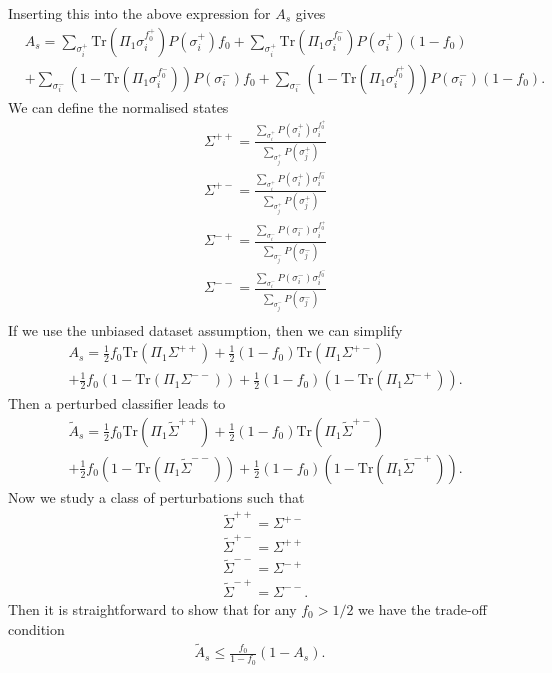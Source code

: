\documentclass[onecolumn,prx, superscriptaddress,longbibliography,margin=1mm 11pt]{revtex4-2}
\begin{document}
Inserting this into the above expression for $A_s$ gives
\begin{align}
    &A_s=\sum_{\sigma_i^+}\text{Tr}(\Pi_1 \sigma^{f_0^+}_i)P(\sigma^+_i)f_0+\sum_{\sigma_i^+}\text{Tr}(\Pi_1 \sigma^{f_0^-}_i)P(\sigma^+_i)(1-f_0) \nonumber \\
    &+\sum_{\sigma_i^-}(1-\text{Tr}(\Pi_{1} \sigma^{f_0^-}_i))P(\sigma^-_i)f_0+ \sum_{\sigma_i^-}(1-\text{Tr}(\Pi_{1} \sigma^{f_0^+}_i))P(\sigma^-_i)(1-f_0).
\end{align}
We can define the normalised states
\begin{align}
    & \Sigma^{++}=\frac{\sum_{\sigma_i^+} P(\sigma_i^+)\sigma^{f_0^+}_i}{\sum_{\sigma_j^+} P(\sigma_j^+)} \nonumber \\
    &\Sigma^{+-}=\frac{\sum_{\sigma_i^+} P(\sigma_i^+)\sigma^{f_0^-}_i}{\sum_{\sigma_j^+} P(\sigma_j^+)} \nonumber \\
    &\Sigma^{-+}=\frac{\sum_{\sigma_i^-} P(\sigma_i^-)\sigma^{f_0^+}_i}{\sum_{\sigma_j^-} P(\sigma_j^-)} \nonumber \\
     &\Sigma^{--}=\frac{\sum_{\sigma_i^-} P(\sigma_i^-)\sigma^{f_0^-}_i}{\sum_{\sigma_j^-} P(\sigma_j^-)} \nonumber \\
\end{align}
If we use the unbiased dataset assumption, then we can simplify
\begin{align}
  &  A_s=\frac{1}{2}f_0 \text{Tr}(\Pi_1 \Sigma^{++})+\frac{1}{2}(1-f_0)\text{Tr}(\Pi_1\Sigma^{+-}) \nonumber \\
&+\frac{1}{2}f_0(1-\text{Tr}(\Pi_1 \Sigma^{--}))+\frac{1}{2}(1-f_0)(1-\text{Tr}(\Pi_1 \Sigma^{-+})).
\end{align}
Then a perturbed classifier leads to 
\begin{align}
    & \tilde{A}_s=\frac{1}{2}f_0 \text{Tr}(\Pi_1 \tilde{\Sigma}^{++})+\frac{1}{2}(1-f_0)\text{Tr}(\Pi_1\tilde{\Sigma}^{+-}) \nonumber \\
&+\frac{1}{2}f_0(1-\text{Tr}(\Pi_1 \tilde{\Sigma}^{--}))+\frac{1}{2}(1-f_0)(1-\text{Tr}(\Pi_1 \tilde{\Sigma}^{-+})).
\end{align}
Now we study a class of perturbations such that 
\begin{align}
    & \tilde{\Sigma}^{++}=\Sigma^{+-} \nonumber \\
    & \tilde{\Sigma}^{+-}=\Sigma^{++} \nonumber \\
    & \tilde{\Sigma}^{--}=\Sigma^{-+} \nonumber \\
    &\tilde{\Sigma}^{-+}=\Sigma^{--}.
\end{align}
Then it is straightforward to show that for any $f_0>1/2$ we have the trade-off condition
\begin{align}
    \tilde{A}_s \leq \frac{f_0}{1-f_0}(1-A_s).
\end{align} 
\end{document}
